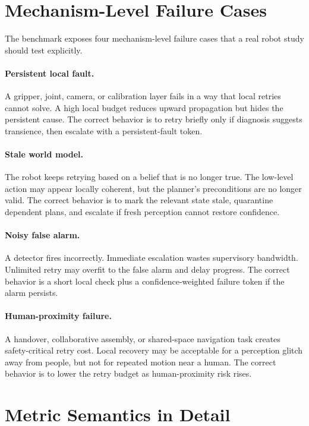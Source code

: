 \section{Mechanism-Level Failure Cases}

The benchmark exposes four mechanism-level failure cases that a real robot study should test explicitly.

\paragraph{Persistent local fault.}
A gripper, joint, camera, or calibration layer fails in a way that local retries cannot solve. A high local budget reduces upward propagation but hides the persistent cause. The correct behavior is to retry briefly only if diagnosis suggests transience, then escalate with a persistent-fault token.

\paragraph{Stale world model.}
The robot keeps retrying based on a belief that is no longer true. The low-level action may appear locally coherent, but the planner's preconditions are no longer valid. The correct behavior is to mark the relevant state stale, quarantine dependent plans, and escalate if fresh perception cannot restore confidence.

\paragraph{Noisy false alarm.}
A detector fires incorrectly. Immediate escalation wastes supervisory bandwidth. Unlimited retry may overfit to the false alarm and delay progress. The correct behavior is a short local check plus a confidence-weighted failure token if the alarm persists.

\paragraph{Human-proximity failure.}
A handover, collaborative assembly, or shared-space navigation task creates safety-critical retry cost. Local recovery may be acceptable for a perception glitch away from people, but not for repeated motion near a human. The correct behavior is to lower the retry budget as human-proximity risk rises.

\section{Metric Semantics in Detail}


